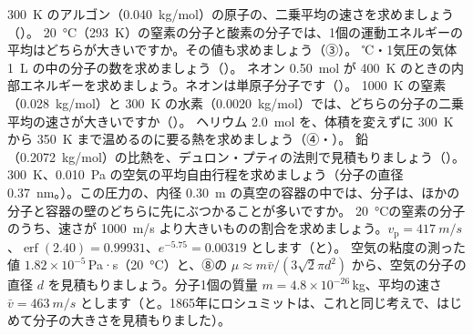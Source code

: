 \bkendproblems
{}
\bkproblem \qty{300}{K} のアルゴン（\qty{0.040}{kg/mol}）の原子の、二乗平均の速さを求めましょう（\nobreak{}\nobreak）。
\bkproblem \qty{20}{\celsius}（\qty{293}{K}）の窒素の分子と酸素の分子では、1個の運動エネルギーの平均はどちらが大きいですか。その値も求めましょう（③）。
 ℃・1気圧の気体 \qty{1}{L} の中の分子の数を求めましょう（\nobreak{}\nobreak）。
\bkproblem ネオン \qty{0.50}{mol} が \qty{400}{K} のときの内部エネルギーを求めましょう。ネオンは単原子分子です（\nobreak{}\nobreak）。
\bkproblem \qty{1000}{K} の窒素（\qty{0.028}{kg/mol}）と \qty{300}{K} の水素（\qty{0.0020}{kg/mol}）では、どちらの分子の二乗平均の速さが大きいですか（\nobreak{}\nobreak）。
\bkproblem ヘリウム \qty{2.0}{mol} を、体積を変えずに \qty{300}{K} から \qty{350}{K} まで温めるのに要る熱を求めましょう（④・\nobreak）。
\bkproblem 鉛（\qty{0.2072}{kg/mol}）の比熱を、デュロン・プティの法則で見積もりましょう（\nobreak{}\nobreak）。
\bkproblem \qty{300}{K}、\qty{0.010}{Pa} の空気の平均自由行程を求めましょう（分子の直径 \qty{0.37}{nm}。\hspace{0.3\zw}\nobreak）。この圧力の、内径 \qty{0.30}{m} の真空の容器の中では、分子は、ほかの分子と容器の壁のどちらに先にぶつかることが多いですか。
\bkproblem \qty{20}{\celsius}の窒素の分子のうち、速さが \qty{1000}{m/s} より大きいものの割合を求めましょう。$v_{\mathrm p}=\qty{417}{m/s}$、$\operatorname{erf}(2.40)=0.99931$、$e^{-5.75}=0.00319$ とします（\nobreak{}\nobreak と\nobreak）。
\bkproblem 空気の粘度の測った値 $1.82\times10^{-5}$\,Pa·s（\qty{20}{\celsius}）と、⑧の $\mu\approx m\bar v/(3\sqrt2\pi d^2)$ から、空気の分子の直径 $d$ を見積もりましょう。分子1個の質量 $m=4.8\times10^{-26}$\,kg、平均の速さ $\bar v=\qty{463}{m/s}$ とします（\nobreak{}\nobreak と\nobreak。1865年にロシュミットは、これと同じ考えで、はじめて分子の大きさを見積もりました）。

